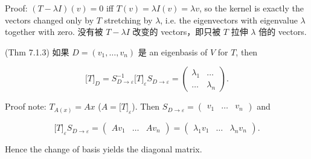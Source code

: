 Proof: \(\left( {T - \lambda I} \right)(v) = 0\) iff \(T(v) = \lambda I(v) = \lambda v\), so the kernel is exactly the vectors changed only by \(T\) stretching by \(\lambda\), i.e. the eigenvectors with eigenvalue \(\lambda\) together with zero. 没有被 \(T - \lambda I\) 改变的 vectors，即只被 \(T\) 拉伸 \(\lambda\) 倍的 vectors.

(Thm 7.1.3) 如果 \(D = \left( {v_{1},\ldots,v_{n}} \right)\) 是 an eigenbasis of \(V\) for \(T\), then

\[\lbrack T\rbrack_{D} = S_{D\rightarrow\varepsilon}^{- 1}\lbrack T\rbrack_{\varepsilon}S_{D\rightarrow\varepsilon} = \begin{pmatrix}
\lambda_{1} & \ldots \\
\ldots & \lambda_{n}
\end{pmatrix}.\]

Proof note: \(T_{A{(x)}} = Ax\) (\(A = \lbrack T\rbrack_{\varepsilon}\)). Then \(S_{D\rightarrow\varepsilon} = \begin{pmatrix}
v_{1} & \ldots & v_{n}
\end{pmatrix}\) and

\[\lbrack T\rbrack_{\varepsilon}S_{D\rightarrow\varepsilon} = \begin{pmatrix}
{Av_{1}} & \ldots & {Av_{n}}
\end{pmatrix} = \begin{pmatrix}
{\lambda_{1}v_{1}} & \ldots & {\lambda_{n}v_{n}}
\end{pmatrix}.\]

Hence the change of basis yields the diagonal matrix.

